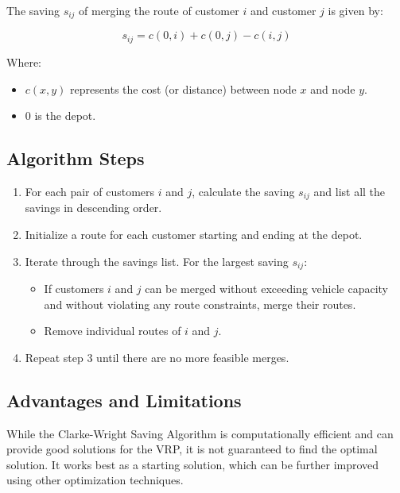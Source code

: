 The saving \(s_{ij}\) of merging the route of customer \(i\) and customer \(j\) is given by:

\begin{equation}
s_{ij} = c(0, i) + c(0, j) - c(i, j)
\end{equation}

Where:
\begin{itemize}
    \item \(c(x, y)\) represents the cost (or distance) between node \(x\) and node \(y\).
    \item \(0\) is the depot.
\end{itemize}

\subsection{Algorithm Steps}

\begin{enumerate}
    \item For each pair of customers \(i\) and \(j\), calculate the saving \(s_{ij}\) and list all the savings in descending order.
    \item Initialize a route for each customer starting and ending at the depot.
    \item Iterate through the savings list. For the largest saving \(s_{ij}\):
    \begin{itemize}
        \item If customers \(i\) and \(j\) can be merged without exceeding vehicle capacity and without violating any route constraints, merge their routes.
        \item Remove individual routes of \(i\) and \(j\).
    \end{itemize}
    \item Repeat step 3 until there are no more feasible merges.
\end{enumerate}

\subsection{Advantages and Limitations}

While the Clarke-Wright Saving Algorithm is computationally efficient and can provide good solutions for the VRP, it is not guaranteed to find the optimal solution. It works best as a starting solution, which can be further improved using other optimization techniques.



